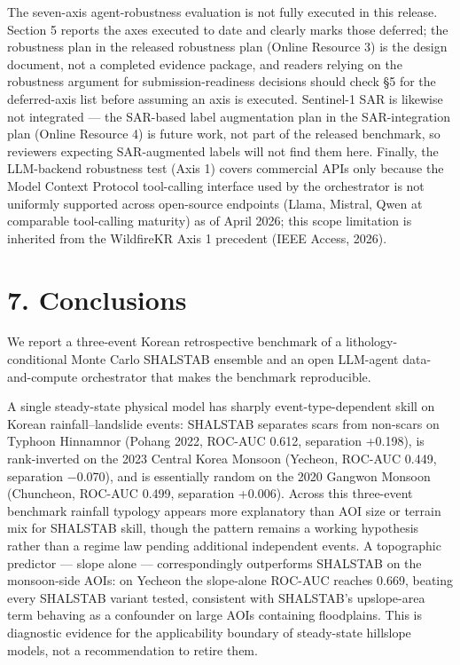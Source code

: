 \documentclass[11pt,a4paper]{article}
\begin{document}
The seven-axis agent-robustness evaluation is not fully executed in this release. Section 5 reports the axes executed to date and clearly marks those deferred; the robustness plan in the released robustness plan (Online Resource 3) is the design document, not a completed evidence package, and readers relying on the robustness argument for submission-readiness decisions should check §5 for the deferred-axis list before assuming an axis is executed. Sentinel-1 SAR is likewise not integrated --- the SAR-based label augmentation plan in the SAR-integration plan (Online Resource 4) is future work, not part of the released benchmark, so reviewers expecting SAR-augmented labels will not find them here. Finally, the LLM-backend robustness test (Axis 1) covers commercial APIs only because the Model Context Protocol tool-calling interface used by the orchestrator is not uniformly supported across open-source endpoints (Llama, Mistral, Qwen at comparable tool-calling maturity) as of April 2026; this scope limitation is inherited from the WildfireKR Axis 1 precedent (IEEE Access, 2026).

\section{7. Conclusions}\label{conclusions}

We report a three-event Korean retrospective benchmark of a lithology-conditional Monte Carlo SHALSTAB ensemble and an open LLM-agent data-and-compute orchestrator that makes the benchmark reproducible.

A single steady-state physical model has sharply event-type-dependent skill on Korean rainfall--landslide events: SHALSTAB separates scars from non-scars on Typhoon Hinnamnor (Pohang 2022, ROC-AUC 0.612, separation +0.198), is rank-inverted on the 2023 Central Korea Monsoon (Yecheon, ROC-AUC 0.449, separation −0.070), and is essentially random on the 2020 Gangwon Monsoon (Chuncheon, ROC-AUC 0.499, separation +0.006). Across this three-event benchmark rainfall typology appears more explanatory than AOI size or terrain mix for SHALSTAB skill, though the pattern remains a working hypothesis rather than a regime law pending additional independent events. A topographic predictor --- slope alone --- correspondingly outperforms SHALSTAB on the monsoon-side AOIs: on Yecheon the slope-alone ROC-AUC reaches 0.669, beating every SHALSTAB variant tested, consistent with SHALSTAB's upslope-area term behaving as a confounder on large AOIs containing floodplains. This is diagnostic evidence for the applicability boundary of steady-state hillslope models, not a recommendation to retire them.
\end{document}

